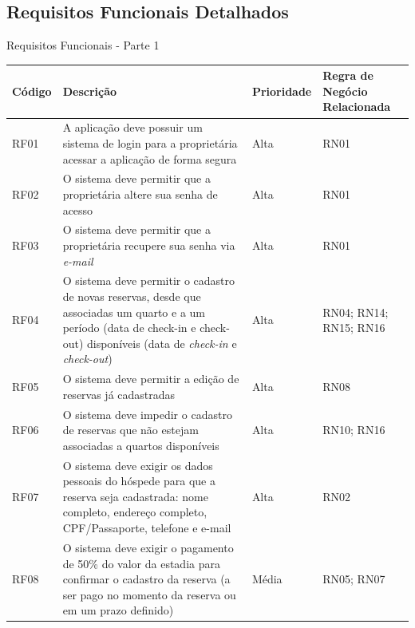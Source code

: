 \documentclass[
	12pt,				%
	openany,			%
	oneside,			%
	a4paper,			%
	english,			%
	french,				%
	spanish,			%
	brazil				%
	]{abntex2}
\begin{document}
\begin{apendicesenv}
\chapter{Requisitos Funcionais Detalhados}
\label{apendice:rfdetalhados}
\begin{quadro}[H]
	\caption{Requisitos Funcionais - Parte 1}
	\label{quadro_rfc1}
	\begin{tabular}{|>{\centering\arraybackslash}p{1.5cm}|p{6.7cm}|>{\centering\arraybackslash}p{2cm}|>{\centering\arraybackslash}p{4cm}|}
		\hline
		\textbf{Código} & \textbf{Descrição} & \textbf{Prioridade} & \textbf{Regra de Negócio Relacionada} \\ \hline
		RF01 & A aplicação deve possuir um sistema de login para a proprietária acessar a aplicação de forma segura & Alta & RN01 \\ \hline
		RF02 & O sistema deve permitir que a proprietária altere sua senha de acesso  & Alta & RN01 \\ \hline
		RF03 & O sistema deve permitir que a proprietária recupere sua senha via \textit{e-mail} & Alta & RN01 \\ \hline
		RF04 & O sistema deve permitir o cadastro de	novas reservas, desde que associadas um quarto e a um período (data de check-in
		e check-out) disponíveis (data de \textit{check-in} e \textit{check-out}) & Alta & RN04; RN14; RN15; RN16 \\ \hline
		RF05 & O sistema deve permitir a edição de reservas já cadastradas & Alta & RN08 \\ \hline
		RF06 & O sistema deve impedir o cadastro de reservas que não estejam associadas a quartos disponíveis & Alta & RN10; RN16 \\ \hline
		RF07 & O sistema deve exigir os dados pessoais do hóspede para que a reserva seja cadastrada: nome completo, endereço completo, CPF/Passaporte, telefone e e-mail & Alta & RN02 \\ \hline
		RF08 & O sistema deve exigir o pagamento de 50\% do valor da estadia para confirmar o cadastro da reserva (a ser pago no momento da reserva ou em um prazo definido) & Média & RN05; RN07 \\ \hline
	\end{tabular}
\end{quadro}


\end{apendicesenv}
\end{document}
